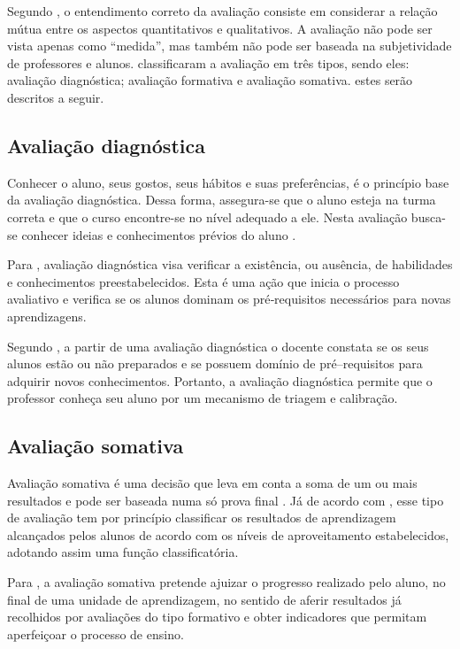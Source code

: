 \documentclass[
	12pt,				%
	openright,			%
	oneside,
	a4paper,			%
	english,			%
	french,				%
	spanish,			%
	brazil,				%
	]{abntex2}
\begin{document}
Segundo , o entendimento correto da avaliação consiste em considerar a relação mútua entre os aspectos quantitativos e qualitativos. A avaliação não pode ser vista apenas como ``medida'', mas também não pode ser baseada na subjetividade de professores e alunos.  classificaram a avaliação em três tipos, sendo eles: avaliação diagnóstica; avaliação formativa e avaliação somativa. estes serão descritos a seguir.

\subsection{Avaliação diagnóstica}
\label{sec:AvaDiag}
Conhecer o aluno, seus gostos, seus hábitos e suas preferências, é o princípio base da avaliação diagnóstica. Dessa forma, assegura-se que o aluno esteja na turma correta e que o curso encontre-se no nível adequado a ele. Nesta avaliação busca-se conhecer ideias e conhecimentos prévios do aluno \cite{masetto1994didatica}.

Para , avaliação diagnóstica visa verificar a existência, ou ausência, de habilidades e conhecimentos preestabelecidos. Esta é uma ação que inicia o processo avaliativo e verifica se os alunos dominam os pré‐requisitos necessários para novas aprendizagens.

Segundo , a partir de uma avaliação diagnóstica o docente constata se os seus alunos estão ou não preparados e se possuem domínio de pré–requisitos para adquirir novos conhecimentos. Portanto, a avaliação diagnóstica permite que o professor conheça seu aluno por um mecanismo de triagem e calibração.

\subsection{Avaliação somativa}
\label{sec:AvaSom}
Avaliação somativa é uma decisão que leva em conta a soma de um ou mais resultados e pode ser baseada numa só prova final \cite{e2004aprender}. Já de acordo com , esse tipo de avaliação tem por princípio classificar os resultados de aprendizagem alcançados pelos alunos de acordo com os níveis de aproveitamento estabelecidos, adotando assim uma função classificatória.

Para , a avaliação somativa pretende ajuizar o progresso realizado pelo aluno, no final de uma unidade de aprendizagem, no sentido de aferir resultados já recolhidos por avaliações do tipo formativo e obter indicadores que permitam aperfeiçoar o processo de ensino.
\end{document}
